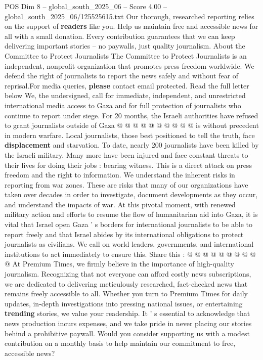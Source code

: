 \begin{textsample}{POS Dim 8 – global\_south\_2025\_06 – Score 4.00 – global\_south\_2025\_06/125525615.txt}
Our thorough, researched reporting relies on the support of \textbf{readers} like you.
Help us maintain free and accessible news for all with a small donation.
Every contribution guarantees that we can keep delivering important stories -- no paywalls, just quality journalism.
About the Committee to Protect Journalists The Committee to Protect Journalists is an independent, nonprofit organization that promotes press freedom worldwide.
We defend the right of journalists to report the news safely and without fear of reprisal.For media queries, \textbf{please} contact email protected.
Read the full letter below We, the undersigned, call for immediate, independent, and unrestricted international media access to Gaza and for full protection of journalists who continue to report under siege.
For 20 months, the Israeli authorities have refused to grant journalists outside of Gaza @ @ @ @ @ @ @ @ @ @ is without precedent in modern warfare.
Local journalists, those best positioned to tell the truth, face \textbf{displacement} and starvation.
To date, nearly 200 journalists have been killed by the Israeli military.
Many more have been injured and face constant threats to their lives for doing their jobs : bearing witness.
This is a direct attack on press freedom and the right to information.
We understand the inherent risks in reporting from war zones.
These are risks that many of our organizations have taken over decades in order to investigate, document developments as they occur, and understand the impacts of war.
At this pivotal moment, with renewed military action and efforts to resume the flow of humanitarian aid into Gaza, it is vital that Israel open Gaza ' s borders for international journalists to be able to report freely and that Israel abides by its international obligations to protect journalists as civilians.
We call on world leaders, governments, and international institutions to act immediately to ensure this.
Share this : @ @ @ @ @ @ @ @ @ @ At Premium Times, we firmly believe in the importance of high-quality journalism.
Recognizing that not everyone can afford costly news subscriptions, we are dedicated to delivering meticulously researched, fact-checked news that remains freely accessible to all.
Whether you turn to Premium Times for daily updates, in-depth investigations into pressing national issues, or entertaining \textbf{trending} stories, we value your readership.
It ' s essential to acknowledge that news production incurs expenses, and we take pride in never placing our stories behind a prohibitive paywall.
Would you consider supporting us with a modest contribution on a monthly basis to help maintain our commitment to free, accessible news?

\end{textsample}
